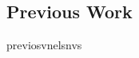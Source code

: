 \documentclass[../main2.tex]{subfiles}
\begin{document}
\subsection{Previous Work}
previosvnelsnvs
\end{document}

